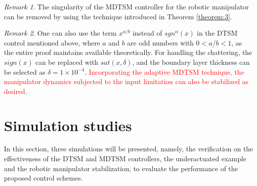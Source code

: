 \documentclass[3p]{elsarticle}
\theoremstyle{plain}
\theoremstyle{remark}
\newtheorem{myrem}{Remark}
\begin{document}
\begin{myrem}
The singularity of the MDTSM controller for the robotic manipulator can be removed by using the technique introduced in Theorem \ref{theorem:3}.
\end{myrem}
\begin{myrem}
One can also use the term $x^{a/b}$ instead of $sgn^\alpha(x)$ in the DTSM control mentioned above, where $a$ and $b$ are odd numbers with $0<a/b<1$, as the entire proof maintains available theoretically. For handling the chattering, the $sign(x)$ can be replaced with $sat(x,\delta)$, and the boundary layer thickness can be selected as $\delta=1\times 10^{-4}$. \textcolor{red}{Incorporating the adaptive MDTSM technique, the manipulator dynamics subjected to the input limitation can also be stabilized as desired.}
\end{myrem}
\section{Simulation studies}\label{sec:4}
In this section, three simulations will be presented, namely, the verification on the effectiveness of the DTSM and MDTSM controllers, the underactuated example and the robotic manipulator stabilization, to evaluate the performance of the proposed control schemes.
\end{document}
